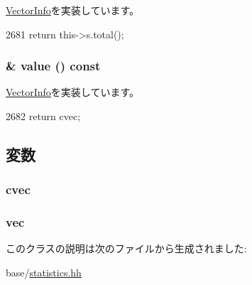 \hyperlink{classStats_1_1VectorInfo_ab152b7e89b37a7db03b04d500ceb8349}{VectorInfo}を実装しています。


\begin{DoxyCode}
2681 { return this->s.total(); }
\end{DoxyCode}
\hypertarget{classStats_1_1FormulaInfoProxy_a1840628d1aea3c4fe5cf3ae375850a4a}{
\subsubsection[{value}]{\& value () const}}
\label{classStats_1_1FormulaInfoProxy_a1840628d1aea3c4fe5cf3ae375850a4a}


\hyperlink{classStats_1_1VectorInfo_a23b21bb9bfe7e45c824c7607a1c301fc}{VectorInfo}を実装しています。


\begin{DoxyCode}
2682 { return cvec; }
\end{DoxyCode}


\subsection{変数}
\hypertarget{classStats_1_1FormulaInfoProxy_a8cc2f3a565a2e54ab797f717802bc894}{
\subsubsection[{cvec}]{ {\bf cvec}}}
\label{classStats_1_1FormulaInfoProxy_a8cc2f3a565a2e54ab797f717802bc894}
\hypertarget{classStats_1_1FormulaInfoProxy_a539785a2cf8aa37d52a6023051f9f797}{
\subsubsection[{vec}]{ {\bf vec}}}
\label{classStats_1_1FormulaInfoProxy_a539785a2cf8aa37d52a6023051f9f797}


このクラスの説明は次のファイルから生成されました:\begin{DoxyCompactItemize}
\item 
base/\hyperlink{statistics_8hh}{statistics.hh}\end{DoxyCompactItemize}
